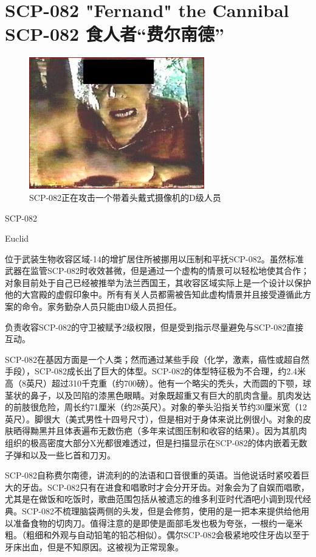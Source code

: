 \chapter[SCP-082 食人者“费尔南德”]{
    SCP-082 "Fernand" the Cannibal\\
    SCP-082 食人者“费尔南德”
}

\label{chap:SCP-082}

\begin{figure}[H]
    \centering
    \includegraphics[width=0.5\linewidth]{images/SCP-082.jpg}
    \caption*{SCP-082正在攻击一个带着头戴式摄像机的D级人员}
\end{figure}

SCP-082

Euclid

位于武装生物收容区域-14的增扩居住所被挪用以压制和平抚SCP-082。虽然标准武器在监管SCP-082时收效甚微，但是通过一个虚构的情景可以轻松地使其合作；对象目前处于自己已经被推举为法兰西国王，其收容区域实际上是一个设计以保护他的大宫殿的虚假印象中。所有有关人员都需被告知此虚构情景并且接受遵循此方案的命令。家务勤杂人员只能由D级人员担任。

负责收容SCP-082的守卫被赋予2级权限，但是受到指示尽量避免与SCP-082直接互动。

SCP-082在基因方面是一个人类；然而通过某些手段（化学，激素，癌性或超自然手段），SCP-082成长出了巨大的体型。SCP-082的体型特征极为不合理，约2.4米高（8英尺）超过310千克重（约700磅）。他有一个略尖的秃头，大而圆的下颚，球茎状的鼻子，以及凹陷的漆黑色眼睛。对象既超重又有巨大的肌肉含量。肌肉发达的前肢很危险，周长约71厘米（约28英尺）。对象的拳头沿指关节约30厘米宽（12英尺）。脚很大（美式男性十四号尺寸），但是相对于身体来说比例很小。对象的皮肤晒得黝黑并且体表遍布无数伤疤（多年来试图压制和收容的结果）。因为其肌肉组织的极高密度大部分X光都很难透过，但是扫描显示在SCP-082的体内嵌着无数子弹和以及一些匕首和刀刃。

SCP-082自称费尔南德，讲流利的的法语和口音很重的英语。当他说话时紧咬着巨大的牙齿。SCP-082只有在进食和唱歌时才会分开牙齿。对象会为了自娱而唱歌，尤其是在做饭和吃饭时，歌曲范围包括从被遗忘的维多利亚时代酒吧小调到现代经典。SCP-082不梳理脑袋两侧的头发，但是会修剪，使用的是一把本来提供给他用以准备食物的切肉刀。值得注意的是即使是面部毛发也极为夸张，一根约一毫米粗。（粗细和外观与自动铅笔的铅芯相似）。偶尔SCP-082会极紧地咬住牙齿以至于牙床出血，但是不知原因。这被视为正常现象。

